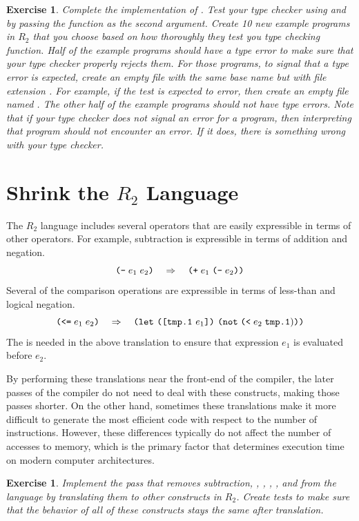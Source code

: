 \documentclass[11pt]{book}
\newtheorem{exercise}[theorem]{Exercise}
\begin{document}
\begin{exercise}\normalfont
Complete the implementation of .  Test your type
checker using  and  by passing
the  function as the second argument.  Create 10 new
example programs in $R_2$ that you choose based on how thoroughly they
test you type checking function. Half of the example programs should
have a type error to make sure that your type checker properly rejects
them. For those programs, to signal that a type error is expected,
create an empty file with the same base name but with file extension
. For example, if the test  is expected
to error, then create an empty file named .  The
other half of the example programs should not have type errors. Note
that if your type checker does not signal an error for a program, then
interpreting that program should not encounter an error.  If it does,
there is something wrong with your type checker.
\end{exercise}


\section{Shrink the $R_2$ Language}
\label{sec:shrink-r2}

The $R_2$ language includes several operators that are easily
expressible in terms of other operators. For example, subtraction is
expressible in terms of addition and negation.
\[
 \texttt{(-}\; e_1 \; e_2\texttt{)} \quad \Rightarrow \quad \texttt{(}\texttt{+} \; e_1 \; \texttt{(}\texttt{-} \; e_2\texttt{)}\texttt{)}
\]
Several of the comparison operations are expressible in terms of
less-than and logical negation.
\[
\texttt{(}\texttt{<=}\; e_1 \; e_2\texttt{)} \quad \Rightarrow \quad
\texttt{(}\texttt{let}~\texttt{(}\texttt{[}\texttt{tmp.1}~e_1\texttt{]}\texttt{)}~\texttt{(}\texttt{not}\;\texttt{(}\texttt{<}\;e_2\;\texttt{tmp.1})\texttt{)}\texttt{)}
\]
The  is needed in the above translation to ensure that
expression $e_1$ is evaluated before $e_2$.

By performing these translations near the front-end of the compiler,
the later passes of the compiler do not need to deal with these
constructs, making those passes shorter. On the other hand, sometimes
these translations make it more difficult to generate the most
efficient code with respect to the number of instructions. However,
these differences typically do not affect the number of accesses to
memory, which is the primary factor that determines execution time on
modern computer architectures.

\begin{exercise}\normalfont
  Implement the pass  that removes subtraction,
  , , \key{<=}, \key{>}, and \key{>=} from the language
  by translating them to other constructs in $R_2$.  Create tests to
  make sure that the behavior of all of these constructs stays the
  same after translation.
\end{exercise}
\end{document}
